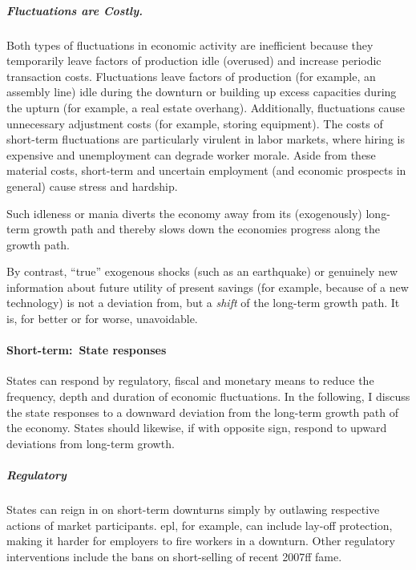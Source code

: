 \subparagraph{Fluctuations are Costly.}
Both types of fluctuations in economic activity are inefficient because they temporarily leave factors of production idle (overused) and increase periodic transaction costs.
Fluctuations leave factors of production (for example, an assembly line) idle during the downturn or building up excess capacities during the upturn (for example, a real estate overhang).
Additionally, fluctuations cause unnecessary adjustment costs (for example, storing equipment).
The costs of short-term fluctuations are particularly virulent in labor markets, where hiring is expensive and unemployment can degrade worker morale.
Aside from these material costs, short-term and uncertain employment (and economic prospects in general) cause stress and hardship.

Such idleness or mania diverts the economy away from its (exogenously) long-term growth path and thereby slows down the economies progress along the growth path.

By contrast, ``true'' exogenous shocks (such as an earthquake) or genuinely new information about future utility of present savings (for example, because of a new technology) is not a deviation from, but a \emph{shift} of the long-term growth path.
It is, for better or for worse, unavoidable.

\paragraph{Short-term:~State responses}
States can respond by regulatory, fiscal and monetary means to reduce the frequency, depth and duration of economic fluctuations.
In the following, I discuss the state responses to a downward deviation from the long-term growth path of the economy.
States should likewise, if with opposite sign, respond to upward deviations from long-term growth.

\subparagraph{Regulatory}
States can reign in on short-term downturns simply by outlawing respective actions of market participants.
\gls{epl}, for example, can include lay-off protection, making it harder for employers to fire workers in a downturn.
Other regulatory interventions include the bans on short-selling of recent 2007ff fame.

